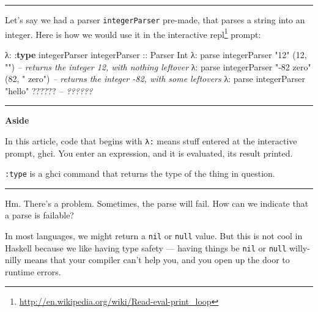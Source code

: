 \documentclass[]{article}
\newenvironment{Shaded}{}{}
\newcommand{\CommentTok}[1]{\textcolor[rgb]{0.38,0.63,0.69}{\textit{#1}}}
\newcommand{\DataTypeTok}[1]{\textcolor[rgb]{0.56,0.13,0.00}{#1}}
\newcommand{\DecValTok}[1]{\textcolor[rgb]{0.25,0.63,0.44}{#1}}
\newcommand{\FunctionTok}[1]{\textcolor[rgb]{0.02,0.16,0.49}{#1}}
\newcommand{\KeywordTok}[1]{\textcolor[rgb]{0.00,0.44,0.13}{\textbf{#1}}}
\newcommand{\NormalTok}[1]{#1}
\newcommand{\OtherTok}[1]{\textcolor[rgb]{0.00,0.44,0.13}{#1}}
\newcommand{\StringTok}[1]{\textcolor[rgb]{0.25,0.44,0.63}{#1}}
\renewcommand{\href}[2]{#2\footnote{\url{#1}}}
\begin{document}
\begin{center}\rule{0.5\linewidth}{\linethickness}\end{center}

Let's say we had a parser \texttt{integerParser} pre-made, that parses a string
into an integer. Here is how we would use it in the interactive
\href{http://en.wikipedia.org/wiki/Read-eval-print_loop}{repl} prompt:

\begin{Shaded}
\begin{Highlighting}[]
\NormalTok{λ}\FunctionTok{:} \FunctionTok{:}\KeywordTok{type}\NormalTok{ integerParser}
\OtherTok{integerParser ::} \DataTypeTok{Parser} \DataTypeTok{Int}
\NormalTok{λ}\FunctionTok{:}\NormalTok{ parse integerParser }\StringTok{"12"}
\NormalTok{(}\DecValTok{12}\NormalTok{, }\StringTok{""}\NormalTok{)                    }\CommentTok{-- returns the integer 12, with nothing leftover}
\NormalTok{λ}\FunctionTok{:}\NormalTok{ parse integerParser }\StringTok{"-82 zero"}
\NormalTok{(}\DecValTok{82}\NormalTok{, }\StringTok{" zero"}\NormalTok{)               }\CommentTok{-- returns the integer -82, with some leftovers}
\NormalTok{λ}\FunctionTok{:}\NormalTok{ parse integerParser }\StringTok{"hello"}
\FunctionTok{??????}                      \CommentTok{-- ??????}
\end{Highlighting}
\end{Shaded}

\begin{center}\rule{0.5\linewidth}{\linethickness}\end{center}

\textbf{Aside}

In this article, code that begins with \texttt{λ:} means stuff entered at the
interactive prompt, ghci. You enter an expression, and it is evaluated, its
result printed.

\texttt{:type} is a ghci command that returns the type of the thing in question.

\begin{center}\rule{0.5\linewidth}{\linethickness}\end{center}

Hm. There's a problem. Sometimes, the parse will fail. How can we indicate that
a parse is failable?

In most languages, we might return a \texttt{nil} or \texttt{null} value. But
this is not cool in Haskell because we like having type safety --- having things
be \texttt{nil} or \texttt{null} willy-nilly means that your compiler can't help
you, and you open up the door to runtime errors.
\end{document}
